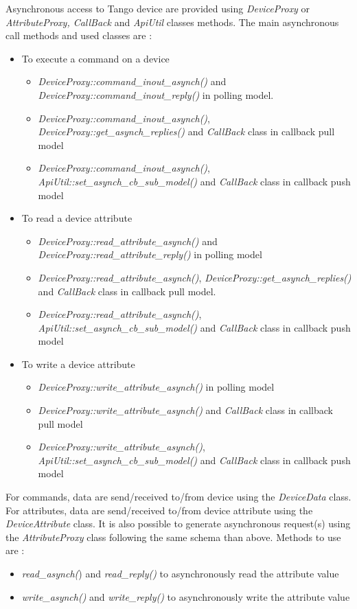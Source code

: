 Asynchronous access to Tango device are provided using \emph{DeviceProxy}
or \emph{AttributeProxy, CallBack} and \emph{ApiUtil} classes methods.
The main asynchronous call methods and used classes are :
\begin{itemize}
\item To execute a command on a device

\begin{itemize}
\item \emph{DeviceProxy::command\_inout\_asynch()} and \emph{DeviceProxy::command\_inout\_reply()}
in polling model.
\item \emph{DeviceProxy::command\_inout\_asynch()}, \emph{DeviceProxy::get\_asynch\_replies()}
and \emph{CallBack} class in callback pull model
\item \emph{DeviceProxy::command\_inout\_asynch()}, \emph{ApiUtil::set\_asynch\_cb\_sub\_model()}
and \emph{CallBack} class in callback push model
\end{itemize}
\item To read a device attribute 

\begin{itemize}
\item \emph{DeviceProxy::read\_attribute\_asynch()} and \emph{DeviceProxy::read\_attribute\_reply()}
in polling model
\item \emph{DeviceProxy::read\_attribute\_asynch()}, \emph{DeviceProxy::get\_asynch\_replies()}
and \emph{CallBack} class in callback pull model.
\item \emph{DeviceProxy::read\_attribute\_asynch()}, \emph{ApiUtil::set\_asynch\_cb\_sub\_model()}
and \emph{CallBack} class in callback push model
\end{itemize}
\item To write a device attribute

\begin{itemize}
\item \emph{DeviceProxy::write\_attribute\_asynch()} in polling model
\item \emph{DeviceProxy::write\_attribute\_asynch()} and \emph{CallBack}
class in callback pull model
\item \emph{DeviceProxy::write\_attribute\_asynch()}, \emph{ApiUtil::set\_asynch\_cb\_sub\_model()}
and \emph{CallBack} class in callback push model
\end{itemize}
\end{itemize}
For commands, data are send/received to/from device using the \emph{DeviceData}
class. For attributes, data are send/received to/from device attribute
using the \emph{DeviceAttribute} class. It is also possible to generate
asynchronous request(s) using the \emph{AttributeProxy}
class following the same schema than above. Methods to use are :
\begin{itemize}
\item \emph{read\_asynch(}) and \emph{read\_reply()} to asynchronously read
the attribute value
\item \emph{write\_asynch()} and \emph{write\_reply()} to asynchronously
write the attribute value
\end{itemize}

